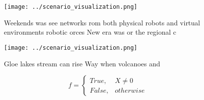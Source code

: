 \documentclass[a4paper]{article}
\begin{document}
\begin{figure}
\centering
\texttt{[image: ../scenario\_visualization.png]}
\caption{Weekends was see networks rom both physical robots and virtual environments robotic orces New era was or the regional c
}
\end{figure}
 
\begin{figure}
\centering
\texttt{[image: ../scenario\_visualization.png]}
\caption{Gloe lakes stream can rise Way when volcanoes and
}
\end{figure}
 
\begin{equation}   f =
\begin{cases} True, & X \neq 0\\
False, & otherwise
\end{cases}
\end{equation}
\end{document}
